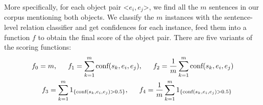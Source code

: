 More specifically, for each object pair \textless$e_i,e_j$\textgreater, 
we find all the $m$ sentences in our corpus mentioning both objects.
We classify the $m$ instances with the sentence-level relation classifier and get confidences for each instance, 
feed them into a function $f$ to obtain the final score 
of the object pair. 
There are five variants of the scoring functions:
\begin{align*}
	f_0=m \textnormal{,~~~~~}
	f_1=\sum_{k=1}^{m}\textnormal{conf}(s_k,e_i,e_j)&
	\textnormal{,~~}{~~~}f_2=\frac{1}{m}\sum_{k=1}^{m}\textnormal{conf}(s_k,e_i,e_j)
	\\
	f_3=\sum_{k=1}^{m}1_{\{\textnormal{conf}(s_k,e_i,e_j)>0.5\}}\textnormal{,~~~~~}&
	f_4=\frac{1}{m}\sum_{k=1}^{m}1_{ \{ \textnormal{conf}(s_k,e_i,e_j)>0.5 \}} \\
\end{align*}


